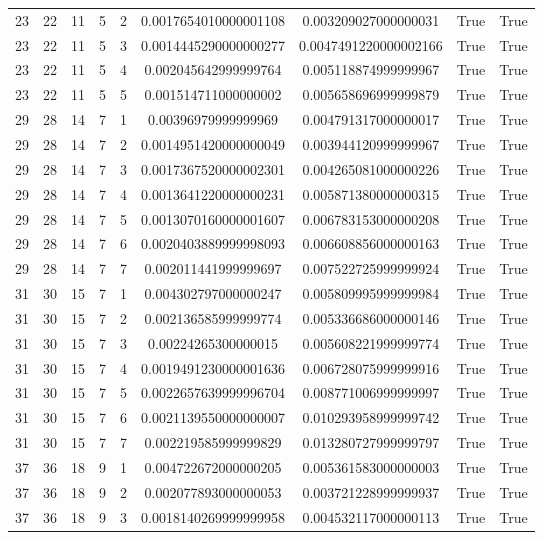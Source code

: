 \documentclass[a4paper,11pt]{article}
\begin{document}
\begin{landscape}
\begin{longtable}{ccccccccc}
23 & 22 & 11 & 5 & 2 & 0.0017654010000001108 & 0.003209027000000031 & True & True \\
23 & 22 & 11 & 5 & 3 & 0.0014445290000000277 & 0.0047491220000002166 & True & True \\
23 & 22 & 11 & 5 & 4 & 0.002045642999999764 & 0.005118874999999967 & True & True \\
23 & 22 & 11 & 5 & 5 & 0.001514711000000002 & 0.005658696999999879 & True & True \\
29 & 28 & 14 & 7 & 1 & 0.00396979999999969 & 0.004791317000000017 & True & True \\
29 & 28 & 14 & 7 & 2 & 0.0014951420000000049 & 0.003944120999999967 & True & True \\
29 & 28 & 14 & 7 & 3 & 0.0017367520000002301 & 0.004265081000000226 & True & True \\
29 & 28 & 14 & 7 & 4 & 0.0013641220000000231 & 0.005871380000000315 & True & True \\
29 & 28 & 14 & 7 & 5 & 0.0013070160000001607 & 0.006783153000000208 & True & True \\
29 & 28 & 14 & 7 & 6 & 0.0020403889999998093 & 0.006608856000000163 & True & True \\
29 & 28 & 14 & 7 & 7 & 0.002011441999999697 & 0.007522725999999924 & True & True \\
31 & 30 & 15 & 7 & 1 & 0.004302797000000247 & 0.005809995999999984 & True & True \\
31 & 30 & 15 & 7 & 2 & 0.002136585999999774 & 0.005336686000000146 & True & True \\
31 & 30 & 15 & 7 & 3 & 0.00224265300000015 & 0.005608221999999774 & True & True \\
31 & 30 & 15 & 7 & 4 & 0.0019491230000001636 & 0.006728075999999916 & True & True \\
31 & 30 & 15 & 7 & 5 & 0.0022657639999996704 & 0.008771006999999997 & True & True \\
31 & 30 & 15 & 7 & 6 & 0.0021139550000000007 & 0.010293958999999742 & True & True \\
31 & 30 & 15 & 7 & 7 & 0.002219585999999829 & 0.013280727999999797 & True & True \\
37 & 36 & 18 & 9 & 1 & 0.004722672000000205 & 0.005361583000000003 & True & True \\
37 & 36 & 18 & 9 & 2 & 0.002077893000000053 & 0.003721228999999937 & True & True \\
37 & 36 & 18 & 9 & 3 & 0.0018140269999999958 & 0.004532117000000113 & True & True \\

\end{longtable}
\end{landscape}
\end{document}
